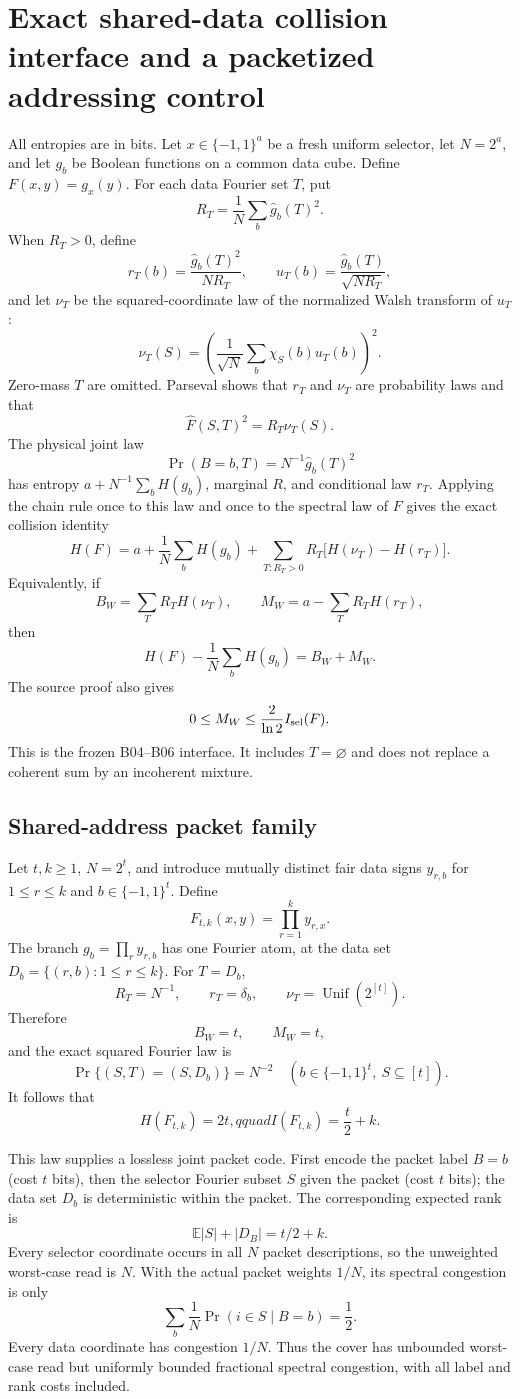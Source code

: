 \section*{Exact shared-data collision interface and a packetized addressing control}

All entropies are in bits.  Let $x\in\{-1,1\}^a$ be a fresh uniform
selector, let $N=2^a$, and let $g_b$ be Boolean functions on a common data
cube.  Define $F(x,y)=g_x(y)$.  For each data Fourier set $T$, put
\[
R_T=\frac1N\sum_b\widehat g_b(T)^2.
\]
When $R_T>0$, define
\[
r_T(b)=\frac{\widehat g_b(T)^2}{NR_T},\qquad
u_T(b)=\frac{\widehat g_b(T)}{\sqrt{NR_T}},
\]
and let $\nu_T$ be the squared-coordinate law of the normalized Walsh
transform of $u_T$:
\[
\nu_T(S)=\left(\frac1{\sqrt N}\sum_b\chi_S(b)u_T(b)\right)^2.
\]
Zero-mass $T$ are omitted.  Parseval shows that $r_T$ and $\nu_T$ are
probability laws and that
\[
\widehat F(S,T)^2=R_T\nu_T(S).
\]
The physical joint law
\[
\Pr(B=b,T)=N^{-1}\widehat g_b(T)^2
\]
has entropy $a+N^{-1}\sum_bH(g_b)$, marginal $R$, and conditional law
$r_T$.  Applying the chain rule once to this law and once to the spectral
law of $F$ gives the exact collision identity
\[
H(F)=a+\frac1N\sum_bH(g_b)
 +\sum_{T:R_T>0}R_T\bigl[H(\nu_T)-H(r_T)\bigr].
\]
Equivalently, if
\[
B_W=\sum_T R_TH(\nu_T),\qquad
M_W=a-\sum_T R_TH(r_T),
\]
then
\[
H(F)-\frac1N\sum_bH(g_b)=B_W+M_W.
\]
The source proof also gives
\[
0\le M_W\le\frac{2}{\ln2}I_{\rm sel}(F).
\]
This is the frozen B04--B06 interface.  It includes $T=\varnothing$ and
does not replace a coherent sum by an incoherent mixture.

\subsection*{Shared-address packet family}

Let $t,k\ge1$, $N=2^t$, and introduce mutually distinct fair data signs
$y_{r,b}$ for $1\le r\le k$ and $b\in\{-1,1\}^t$.  Define
\[
F_{t,k}(x,y)=\prod_{r=1}^k y_{r,x}.
\]
The branch $g_b=\prod_r y_{r,b}$ has one Fourier atom, at the data set
$D_b=\{(r,b):1\le r\le k\}$.  For $T=D_b$,
\[
R_T=N^{-1},\qquad r_T=\delta_b,\qquad
\nu_T=\operatorname{Unif}(2^{[t]}).
\]
Therefore
\[
B_W=t,\qquad M_W=t,
\]
and the exact squared Fourier law is
\[
\Pr\{(S,T)=(S,D_b)\}=N^{-2}
\quad(b\in\{-1,1\}^t,\ S\subseteq[t]).
\]
It follows that
\[
H(F_{t,k})=2t,qquad I(F_{t,k})=\frac t2+k.
\]

This law supplies a lossless joint packet code.  First encode the packet
label $B=b$ (cost $t$ bits), then the selector Fourier subset $S$ given the
packet (cost $t$ bits); the data set $D_b$ is deterministic within the
packet.  The corresponding expected rank is
\[
\mathbb E|S|+|D_B|=t/2+k.
\]
Every selector coordinate occurs in all $N$ packet descriptions, so the
unweighted worst-case read is $N$.  With the actual packet weights $1/N$,
its spectral congestion is only
\[
\sum_b\frac1N\Pr(i\in S\mid B=b)=\frac12.
\]
Every data coordinate has congestion $1/N$.  Thus the cover has unbounded
worst-case read but uniformly bounded fractional spectral congestion, with
all label and rank costs included.

